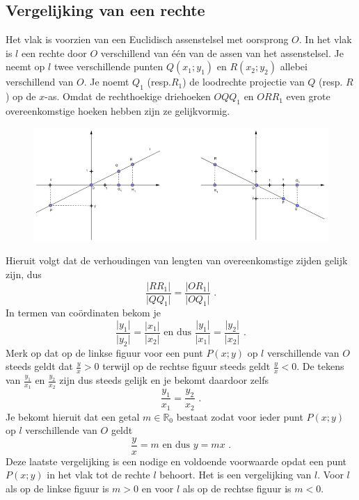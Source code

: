 \subsection{Vergelijking van een rechte}
\noindent

Het vlak is voorzien van een Euclidisch assenstelsel met oorsprong $O$.
In het vlak is $l$ een rechte door $O$ verschillend van \'e\'en van de assen van het assenstelsel.
Je neemt op $l$ twee verschillende punten $Q(x_1;y_1)$ en $R(x_2;y_2)$ allebei verschillend van $O$.
Je noemt $Q_1$ (resp.$R_1$) de loodrechte projectie van $Q$ (resp. $R$) op de $x$-as.
Omdat de rechthoekige driehoeken $OQQ_1$ en $ORR_1$ even grote overeenkomstige hoeken hebben zijn ze gelijkvormig.
\begin{figure}[!htb]
\begin{center}
\includegraphics[height=5 cm]{4_opp_inhoud_an_meetk/inputs/AMTekst4Fig1}
\end{center}
\end{figure} 
Hieruit volgt dat de verhoudingen van lengten van overeenkomstige zijden gelijk zijn, dus
\[
\frac {\vert RR_1 \vert}{\vert QQ_1 \vert}=\frac {\vert OR_1 \vert}{\vert OQ_1 \vert} \text { .}
\]
In termen van co\"ordinaten bekom je
\[
\frac {\vert y_1 \vert}{\vert y_2 \vert}=\frac {\vert x_1 \vert}{\vert x_2 \vert} \text { en dus } \frac {\vert y_1 \vert}{\vert x_1 \vert}=\frac {\vert y_2 \vert}{\vert x_2 \vert} \text { .}
\]
Merk op dat op de linkse figuur voor een punt $P(x;y)$ op $l$ verschillende van $O$ steeds geldt dat $\frac {y}{x}>0$ terwijl op de rechtse figuur steeds geldt $\frac {y}{x}<0$.
De tekens van $\frac {y_1}{x_1}$ en $\frac {y_2}{x_2}$ zijn dus steeds gelijk en je bekomt daardoor zelfs
\[
\frac {y_1}{x_1} = \frac{y_2}{x_2} \text { .}
\]
Je bekomt hieruit dat een getal $m \in \mathbb{R}_0$ bestaat zodat voor ieder punt $P(x;y)$ op $l$ verschillende van $O$ geldt
\[
\frac {y}{x}=m \text { en dus } y=mx \text { .}
\]
Deze laatste vergelijking is een nodige en voldoende voorwaarde opdat een punt $P(x;y)$ in het vlak tot de rechte $l$ behoort.
Het is een vergelijking van $l$.
Voor $l$ als op de linkse figuur is $m>0$ en voor $l$ als op de rechtse figuur is $m<0$.

